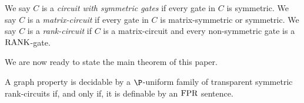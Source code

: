 \documentclass[../paper.tex]{subfiles}
\begin{document}
We say $C$ is a \emph{circuit with symmetric gates} if every gate in $C$ is
symmetric. We say $C$ is a \emph{matrix-circuit} if every gate in $C$ is
matrix-symmetric or symmetric. We say $C$ is a \emph{rank-circuit} if $C$ is a
matrix-circuit and every non-symmetric gate is a $\text{\upshape RANK}$-gate.




We are now ready to state the main theorem of this paper.

\begin{thm}
  A graph property is decidable by a $\P$-uniform family of transparent
  symmetric rank-circuits if, and only if, it is definable by an $\text{\upshape FPR}$
  sentence.
\end{thm}






\end{document}
